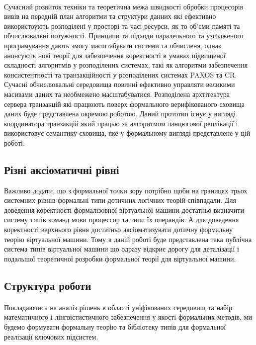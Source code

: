 \documentclass[11pt,oneside]{article}
\begin{document}
   \paragraph{}
   Сучасний розвиток техніки та теоретична межа швидкості обробки процесорів вивів на передній план алгоритми та структури
   данних які ефективно використоують розподілені у просторі та часі ресурси, як то об’єми памяті та обчислювальні потужності.
   Принципи та підходи паралельного та узгодженого програмування дають змогу масштабувати системи та обчисленя, однак
   анонсують нові теорії для забезпечення коректності в умавах підвищеної складності алгоритмів у розподілених системах,
   такі як алгоритми забезпечення консистентності та транзакційності у розподілених системах PAXOS та CR.
   Сучасні обчислювальні середовища повинні ефективно управляти великими масивами
   даних та необмежено масштабуватися. Розподілена архтітектура сервера транзакцій
   які працюють поверх формального верифікованого сховища даних буде представлена
   окремою роботою. Даний прототип існує у вигляді координатора транзакцій який працью
   за алгоритмом ланцюгової реплікації і використовує семантику сховища, яке
   у формальному вигляді представлене у цій роботі.

\subsection*{Різні аксіоматичні рівні}

   Важливо додати, що з формальної точки зору потрібно щоби на границях
   трьох системних рівнів формальні типи дотичних логічних теорій співпадали.
   Для доведення коректності формалізовної віртуальної машини достатньо
   визначити систему типів команд мови процессор та типи їх операндів. А для
   доведення коректності верхнього рівня достатньо аксіоматизувати дотичну
   формальну теорію віртуальної машини. Тому в даній роботі буде представлена
   така публічна система типів віртуальної машини що одразу відкриє дорогу
   для деталізації і подальшої теоретичної розробки формальної теорії для віртуальної машини.

\newpage

\subsection{Структура роботи}
\vspace{0.5cm}

   \paragraph{}
   Покладаючись на аналіз рішень в області уніфікованих середовищ та
   набір математичного і лінгвістистичного забезпечення у якості формальних методів,
   ми будемо формувати формальну теорію та бібліотеку типів для формальної
   реалізації ключових підсистем.
\end{document}
